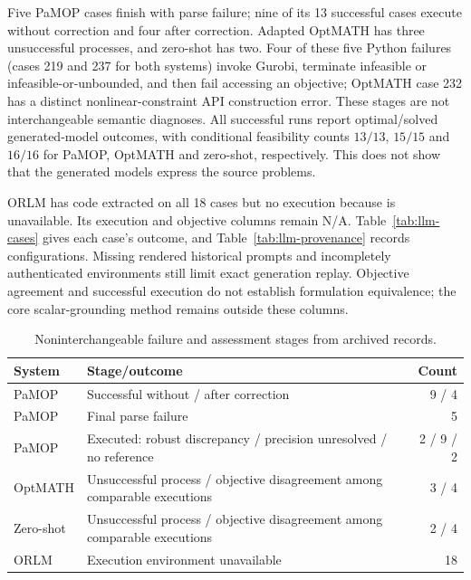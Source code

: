 Five PaMOP cases finish with parse failure; nine of its 13 successful cases execute without correction and four after correction. Adapted OptMATH has three unsuccessful processes, and zero-shot has two. Four of these five Python failures (cases 219 and 237 for both systems) invoke Gurobi, terminate infeasible or infeasible-or-unbounded, and then fail accessing an objective; OptMATH case 232 has a distinct nonlinear-constraint API construction error. These stages are not interchangeable semantic diagnoses. All successful runs report optimal/solved generated-model outcomes, with conditional feasibility counts $13/13$, $15/15$ and $16/16$ for PaMOP, OptMATH and zero-shot, respectively. This does not show that the generated models express the source problems.

ORLM has code extracted on all 18 cases but no execution because  is unavailable. Its execution and objective columns remain N/A. Table~\ref{tab:llm-cases} gives each case's outcome, and Table~\ref{tab:llm-provenance} records configurations. Missing rendered historical prompts and incompletely authenticated environments still limit exact generation replay. Objective agreement and successful execution do not establish formulation equivalence; the core scalar-grounding method remains outside these columns.


\begin{table}[htbp]\centering\small
\caption{Noninterchangeable failure and assessment stages from archived records.}\label{tab:llm-failures}
\begin{tabularx}{\linewidth}{@{}lXr@{}}\toprule
System & Stage/outcome & Count\\\midrule
PaMOP & Successful without / after correction & 9 / 4\\
PaMOP & Final parse failure & 5\\
PaMOP & Executed: robust discrepancy / precision unresolved / no reference & 2 / 9 / 2\\
OptMATH & Unsuccessful process / objective disagreement among comparable executions & 3 / 4\\
Zero-shot & Unsuccessful process / objective disagreement among comparable executions & 2 / 4\\
ORLM & Execution environment unavailable & 18\\\bottomrule
\end{tabularx}\end{table}

